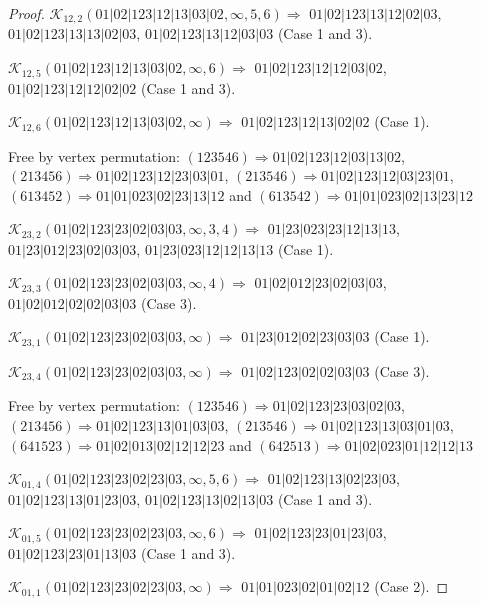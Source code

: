 \documentclass[12pt]{article}
\theoremstyle{plain}
\theoremstyle{definition}
\theoremstyle{remark}
\newcommand{\fancy}[1]{\mathcal{#1}}
\def\K{\fancy{K}}
\begin{document}
\begin{proof}
	
	
	\bigskip
	
	$\K_{12,2}(01|02|123|12|13|03|02,\infty,5, 6)\Rightarrow $ $01|02|123|13|12|02|03$, $01|02|123|13|13|02|03$, $01|02|123|13|12|03|03$ (Case 1 and 3).
	
	$\K_{12,5}(01|02|123|12|13|03|02,\infty,6)\Rightarrow $ $01|02|123|12|12|03|02$, $01|02|123|12|12|02|02$ (Case 1 and 3).
	
	$\K_{12,6}(01|02|123|12|13|03|02,\infty)\Rightarrow $ $01|02|123|12|13|02|02$ (Case 1).
	
	
	
	Free by vertex permutation: $(1 2 3 5 4 6)\Rightarrow 01|02|123|12|03|13|02$, $(2 1 3 4 5 6)\Rightarrow 01|02|123|12|23|03|01$, $(2 1 3 5 4 6)\Rightarrow 01|02|123|12|03|23|01$, $(6 1 3 4 5 2)\Rightarrow 01|01|023|02|23|13|12$ and $(6 1 3 5 4 2)\Rightarrow 01|01|023|02|13|23|12$
	
	
	
	\bigskip
	
	$\K_{23,2}(01|02|123|23|02|03|03,\infty,3, 4)\Rightarrow $ $01|23|023|23|12|13|13$, $01|23|012|23|02|03|03$, $01|23|023|12|12|13|13$ (Case 1).
	
	$\K_{23,3}(01|02|123|23|02|03|03,\infty,4)\Rightarrow $ $01|02|012|23|02|03|03$, $01|02|012|02|02|03|03$ (Case 3).
	
	$\K_{23,1}(01|02|123|23|02|03|03,\infty)\Rightarrow $ $01|23|012|02|23|03|03$ (Case 1).
	
	$\K_{23,4}(01|02|123|23|02|03|03,\infty)\Rightarrow $ $01|02|123|02|02|03|03$ (Case 3).
	
	
	
	Free by vertex permutation: $(1 2 3 5 4 6)\Rightarrow 01|02|123|23|03|02|03$, $(2 1 3 4 5 6)\Rightarrow 01|02|123|13|01|03|03$, $(2 1 3 5 4 6)\Rightarrow 01|02|123|13|03|01|03$, $(6 4 1 5 2 3)\Rightarrow 01|02|013|02|12|12|23$ and $(6 4 2 5 1 3)\Rightarrow 01|02|023|01|12|12|13$
	
	
	
	\bigskip
	
	$\K_{01,4}(01|02|123|23|02|23|03,\infty,5, 6)\Rightarrow $ $01|02|123|13|02|23|03$, $01|02|123|13|01|23|03$, $01|02|123|13|02|13|03$ (Case 1 and 3).
	
	$\K_{01,5}(01|02|123|23|02|23|03,\infty,6)\Rightarrow $ $01|02|123|23|01|23|03$, $01|02|123|23|01|13|03$ (Case 1 and 3).
	
	$\K_{01,1}(01|02|123|23|02|23|03,\infty)\Rightarrow $ $01|01|023|02|01|02|12$ (Case 2).
	

\end{proof}
\end{document}
